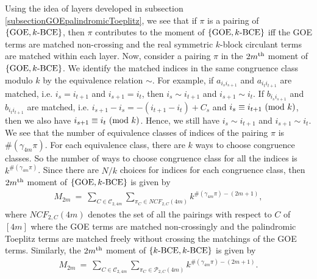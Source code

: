 \documentclass[11pt,reqno]{amsart}
\numberwithin{equation}{section}
\theoremstyle{plain}
\newtheorem{definition}[thm]{Definition}
\newcommand{\textAnd}{
    {
        \hspace{5mm}
        \textrm{and}
        \hspace{5mm}
    }
}
\begin{document}
Using the idea of layers developed in subsection \ref{subsectionGOEpalindromicToeplitz}, we see that if $\pi$ is a pairing of $\{\textup{GOE}, k\textup{-BCE}\}$, then $\pi$ contributes to the moment of $\{\textup{GOE}, k\textup{-BCE}\}$ iff the GOE terms are matched non-crossing and the real symmetric $k$-block circulant terms are matched within each layer. Now, consider a pairing $\pi$ in the $2m\textsuperscript{th}$ moment of $\{\textup{GOE}, k\textup{-BCE}\}$. We identify the matched indices in the same congruence class modulo $k$ by the equivalence relation $\sim$. For example, if $a_{i_si_{s+1}}$ and $a_{i_ti_{t+1}}$ are matched, i.e. $i_s=i_{t+1}$ and $i_{s+1}=i_t$, then $i_s\sim i_{t+1}$ and $i_{s+1}\sim i_t$. If $b_{i_si_{s+1}}$ and $b_{i_ti_{t+1}}$ are matched, i.e. $i_{s+1}-i_s=-(i_{t+1}-i_t)+C_s$ and $i_s\equiv i_{t+1}\textup{ (mod $k$)}$, then we also have $i_{s+1}\equiv i_t\textup{ (mod $k$)}$. Hence, we still have $i_s\sim i_{t+1}$ and $i_{s+1}\sim i_t$. We see that the number of equivalence classes of indices of the pairing $\pi$ is $\#(\gamma_{4m}\pi)$. For each equivalence class, there are $k$ ways to choose congruence classes. So the number of ways to choose congruence class for all the indices is $k^{\#(\gamma_{4m}\pi)}$. Since there are $N/k$ choices for indices for each congruence class, then $2m\textsuperscript{th}$ moment of $\{\textup{GOE}, k\textup{-BCE}\}$ is given by
\begin{align*}
M_{2m} \ = \ \sum_{C\in\mathcal{C}_{2,4m}}\sum_{\pi_C\in NCF_{2,C}(4m)} k^{\#(\gamma_{4m}\pi)-(2m+1)},
\end{align*}
where $NCF_{2,C}(4m)$ denotes the set of all the pairings with respect to $C$ of $[4m]$ where the GOE terms are matched non-crossingly and the palindromic Toeplitz terms are matched freely without crossing the matchings of the GOE terms. Similarly, the $2m\textsuperscript{th}$ moment of $\{k\textup{-BCE}, k\textup{-BCE}\}$ is given by
\begin{align*}
M_{2m} \ = \ \sum_{C\in \mathcal{C}_{2,4m}}\sum_{\pi_C\in \mathcal{P}_{2,C}(4m)}k^{\#(\gamma_{4m}\pi)-(2m+1)}.
\end{align*}


\end{document}
